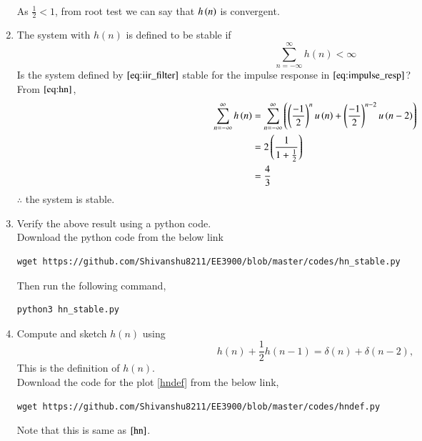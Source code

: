\documentclass[journal,12pt,twocolumn]{IEEEtran}
\renewcommand\thesection{\arabic{section}}
\begin{document}
\begin{enumerate}[label=\thesection.\arabic*]
\begin{align}
           \end{align}
           As $\frac{1}{2} < 1$, from root test we can say that $h\left(n\right)$ is convergent.
     \item The system with $h(n)$ is defined to be stable if
           \begin{equation}
                \sum_{n=-\infty}^{\infty}h(n) < \infty
           \end{equation}
           Is the system defined by $\eqref{eq:iir_filter}$ stable for the impulse response in $\eqref{eq:impulse_resp}$?\\
           \solution From $\eqref{eq:hn}$,
           \begin{align}
                \sum_{n=-\infty}^{\infty}h\left(n\right) & = \sum_{n=-\infty}^{\infty}\left(\left(\frac{-1}{2}\right)^{n} u\left(n\right) + \left(\frac{-1}{2}\right)^{n-2} u\left(n-2\right)\right) \\
                                                   & = 2\left(\frac{1}{1+\frac{1}{2}}\right)                                                                           \\
                                                   & = \frac{4}{3}
           \end{align}
           $\therefore$ the system is stable.
     \item Verify the above result using a python code.\\
           \solution Download the python code from the below link
           \begin{lstlisting}
wget https://github.com/Shivanshu8211/EE3900/blob/master/codes/hn_stable.py
\end{lstlisting}
           Then run the following command,
           \begin{lstlisting}
python3 hn_stable.py
\end{lstlisting}
     \item Compute and sketch $h(n)$ using
           \begin{equation}
                \label{eq:iir_filter_h}
                h(n) + \frac{1}{2}h(n-1) = \delta(n) + \delta(n-2),
           \end{equation}
           This is the definition of $h(n)$.\\
           \solution Download the code for the plot \ref{hndef} from the below link,
           \begin{lstlisting}
wget https://github.com/Shivanshu8211/EE3900/blob/master/codes/hndef.py
\end{lstlisting}
           Note that this is same as $\ref{hn}$.\\

\end{enumerate}
\end{document}
